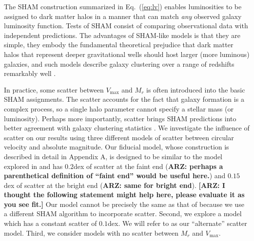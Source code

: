 \documentclass[usenatbib,usegraphicx,letterpaper]{mn2e}
\newcommand{\vmax}{V_{\mathrm{max}}}
\begin{document}
The SHAM construction summarized in Eq.~(\ref{eq:lv}) enables luminosities 
to be assigned to dark matter halos 
in a manner that can match {\em any} observed galaxy luminosity function. 
Tests of SHAM consist of comparing observational data with independent 
predictions.  The advantages of SHAM-like models is that they are 
simple, they embody the fundamental theoretical prejudice that dark 
matter halos that represent deeper gravitational wells should host 
larger (more luminous) galaxies, and such models describe galaxy 
clustering over a range of redshifts remarkably well 
\cite[e.g.,][]{kravtsov_etal04,tasitsiomi_etal04,conroy_etal06,behroozi_etal12}.  


In practice, some scatter between $\vmax$ and $M_r$ is often introduced into the 
basic SHAM assignments. The scatter accounts for the fact that galaxy formation 
is a complex process, so a single halo parameter cannot specify a stellar 
mass (or luminosity).  Perhaps more importantly, scatter brings SHAM predictions 
into better agreement with galaxy clustering statistics 
\citep[e.g.,][]{tasitsiomi_etal04,behroozi_etal10,reddick_etal12}. We investigate 
the influence of scatter on our results using three different models of 
scatter between circular velocity and absolute magnitude. 
Our fiducial model, whose construction is described in detail in Appendix A, 
is designed to be similar to the model explored in \citet{trujillo-gomez_etal11} 
and has $0.2$dex of scatter at the faint end 
({\bf ARZ: perhaps a parenthetical definition of 
``faint end'' would be useful here.}) 
and $0.15$dex of scatter at the bright end ({\bf ARZ: same for bright end}). 
{\bf [ARZ: I thought the following statement might help here, please evaluate 
it as you see fit.]} 
Our model cannot be precisely the same as that of \citet{trujillo-gomez_etal11} 
because we use a different SHAM algorithm to incorporate scatter. 
Second, we explore a model which has a constant scatter of $0.1$dex.  
We will refer to as our ``alternate'' scatter model. 
Third, we consider models with no scatter between $M_r$ and $\vmax.$
\end{document}
